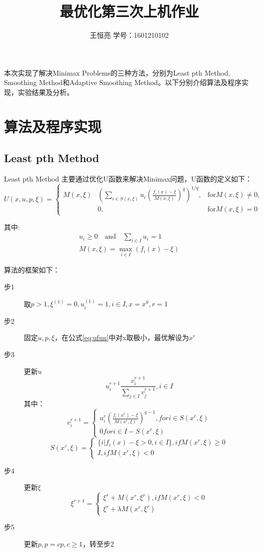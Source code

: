 \documentclass{ctexart}
\begin{document}
\title{最优化第三次上机作业}
\author{王恒亮 \quad 学号：1601210102}
\date{}
\maketitle
本次实现了解决Minimax Problems的三种方法，分别为Least pth Method\cite{Charalambous1979}, Smoothing Method\cite{Xu2001}和Adaptive Smoothing Method\cite{Polak2003}。以下分别介绍算法及程序实现，实验结果及分析。
\section{算法及程序实现}
\subsection{Least pth Method}
Least pth Method 主要通过优化U函数来解决Minimax问题，U函数的定义如下：
\begin{equation}
	\label{eq:ufun}
	U(x,u,p,\xi)=\left\{
		\begin{aligned}
			M(x,\xi)&(\sum_{i\in S(x,\xi)}{u_i(\frac{f_i(x)-\xi}{M(x,\xi)})^q})^{1/q}, &\text{for} M(x,\xi) \neq 0,\\
				       &0, &\text{for} M(x,\xi) = 0
		\end{aligned}\right.
\end{equation}

其中:
\begin{align}
	u_i \geq 0\quad \text{and} \quad\sum_{i\in I}{u_i} = 1\\
	M(x, \xi) = \max_{i\in I}{(f_i(x) - \xi)}
\end{align}

算法的框架如下：
\begin{description}
	\item[步1] 取$p>1, \xi^{(1)} =0,u_i^{(1)}=1,i\in I,x=x^0,r=1$
	\item[步2] 固定$u,p,\xi$，在公式\ref{eq:ufun}中对x取极小，最优解设为$x^r$
	\item[步3] 更新$u$
	\[u^{r+1}_i\frac{v_i^{r+1}}{\sum_{j\in I}{v_j^{r+1}}}, i\in I\]
	其中：
	\[v_{i}^{r+1}=\left\{
		\begin{aligned}
			u_i^r(\frac{f_i(x^r)-\xi}{M(x^r,\xi)})^{q-1}, for i \in S(x^r,\xi)\\
			0 for i\in I - S(x^r, \xi)
		\end{aligned}\right.\]
	\[S(x^r, \xi)=\left\{
		\begin{aligned}
			\{i|f_i(x)-\xi>0,i\in I\}, if M(x^r,\xi) \geq 0\\
			I, if M(x^r,\xi) <0
		\end{aligned}\right.\]
	\item[步4] 更新$\xi$
	\[\xi^{r+1} = \left\{
		\begin{aligned}
			\xi^r + M(x^r, \xi^r) , if M(x^r, \xi) < 0\\
			\xi^r + \lambda M(x^r, \xi^r)
		\end{aligned}\right.\]
	\item[步5] 更新$p, p = cp, c\geq 1$，转至步2
\end{description}
\end{document}
